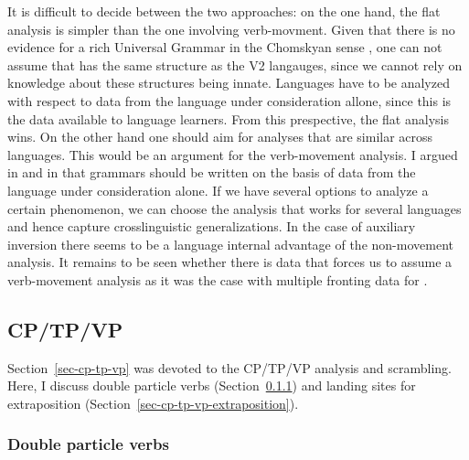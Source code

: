 It is difficult to decide between the two approaches: on the one hand, the flat analysis is simpler
than the one involving verb-movment. Given that there is no evidence for a rich Universal Grammar in
the Chomskyan sense \citep{HCF2002a}, one can not assume that  has the same structure as the
 V2 langauges, since we cannot rely on knowledge about these structures being
innate. Languages have to be analyzed with respect to data from the language under consideration
allone, since this is the data available to language learners. From this prespective, the flat
analysis wins. On the other hand one should aim for analyses that are similar across languages. This
would be an argument for the verb-movement analysis. I argued in  and in
 that grammars should be written on the basis of data from the language under
consideration alone. If we have several options to analyze a certain phenomenon, we can choose the
analysis that works for several languages and hence capture crosslinguistic generalizations. In the
case of  auxiliary inversion there seems to be a language internal advantage of the
non-movement analysis. It remains to be seen whether there is data that forces us to assume a verb-movement
analysis as it was the case with multiple fronting data for  \citep{Mueller2005d,MuellerGS}.





\subsection{CP/TP/VP}
\label{sec-cp-tp-vp-and-verb-last-non-movement}

Section~\ref{sec-cp-tp-vp} was devoted to the CP/TP/VP analysis and
scrambling. Here, I discuss double particle verbs (Section~\ref{sec-cp-tp-vp-double-particles}) and landing sites for extraposition (Section~\ref{sec-cp-tp-vp-extraposition}).

\subsubsection{Double particle verbs}
\label{sec-cp-tp-vp-double-particles}


